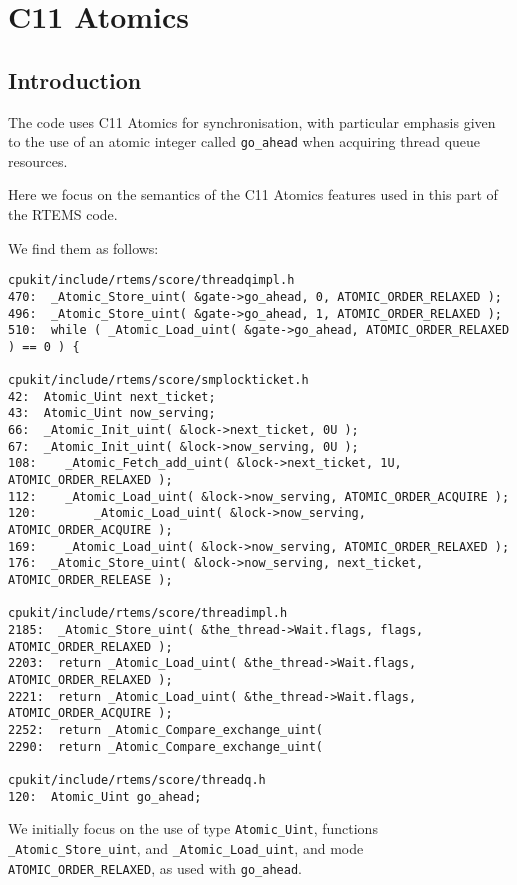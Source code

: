 \section{C11 Atomics}

\subsection{Introduction}

The code uses C11 Atomics for synchronisation,
with particular emphasis given to the use of an atomic integer
called \verb"go_ahead" when acquiring thread queue resources.

Here we focus on the semantics of the C11 Atomics features used in this
part of the RTEMS code.

We find them as follows:
\begin{verbatim}
cpukit/include/rtems/score/threadqimpl.h
470:  _Atomic_Store_uint( &gate->go_ahead, 0, ATOMIC_ORDER_RELAXED );
496:  _Atomic_Store_uint( &gate->go_ahead, 1, ATOMIC_ORDER_RELAXED );
510:  while ( _Atomic_Load_uint( &gate->go_ahead, ATOMIC_ORDER_RELAXED ) == 0 ) {

cpukit/include/rtems/score/smplockticket.h
42:  Atomic_Uint next_ticket;
43:  Atomic_Uint now_serving;
66:  _Atomic_Init_uint( &lock->next_ticket, 0U );
67:  _Atomic_Init_uint( &lock->now_serving, 0U );
108:    _Atomic_Fetch_add_uint( &lock->next_ticket, 1U, ATOMIC_ORDER_RELAXED );
112:    _Atomic_Load_uint( &lock->now_serving, ATOMIC_ORDER_ACQUIRE );
120:        _Atomic_Load_uint( &lock->now_serving, ATOMIC_ORDER_ACQUIRE );
169:    _Atomic_Load_uint( &lock->now_serving, ATOMIC_ORDER_RELAXED );
176:  _Atomic_Store_uint( &lock->now_serving, next_ticket, ATOMIC_ORDER_RELEASE );

cpukit/include/rtems/score/threadimpl.h
2185:  _Atomic_Store_uint( &the_thread->Wait.flags, flags, ATOMIC_ORDER_RELAXED );
2203:  return _Atomic_Load_uint( &the_thread->Wait.flags, ATOMIC_ORDER_RELAXED );
2221:  return _Atomic_Load_uint( &the_thread->Wait.flags, ATOMIC_ORDER_ACQUIRE );
2252:  return _Atomic_Compare_exchange_uint(
2290:  return _Atomic_Compare_exchange_uint(

cpukit/include/rtems/score/threadq.h
120:  Atomic_Uint go_ahead;
\end{verbatim}

We initially focus on the use of type \verb"Atomic_Uint",
functions \verb"_Atomic_Store_uint",
and \verb"_Atomic_Load_uint",
and mode \verb"ATOMIC_ORDER_RELAXED",
as used with \verb"go_ahead".

